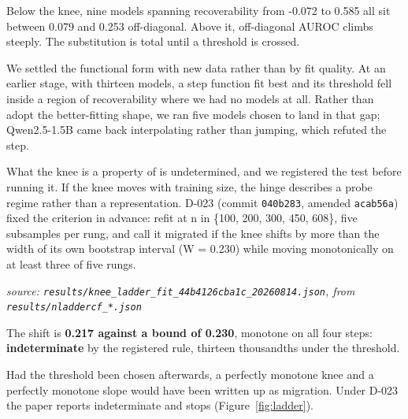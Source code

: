 \documentclass[10pt]{article}
\begin{document}
Below the knee, nine models spanning recoverability from -0.072 to 0.585 all sit between 0.079 and 0.253 off-diagonal. Above it, off-diagonal AUROC climbs steeply. The substitution is total until a threshold is crossed.

We settled the functional form with new data rather than by fit quality. At an earlier stage, with thirteen models, a step function fit best and its threshold fell inside a region of recoverability where we had no models at all. Rather than adopt the better-fitting shape, we ran five models chosen to land in that gap; Qwen2.5-1.5B came back interpolating rather than jumping, which refuted the step.

What the knee is a property of is undetermined, and we registered the test before running it. If the knee moves with training size, the hinge describes a probe regime rather than a representation. D-023 (commit \texttt{040b283}, amended \texttt{acab56a}) fixed the criterion in advance: refit at n in \{100, 200, 300, 450, 608\}, five subsamples per rung, and call it migrated if the knee shifts by more than the width of its own bootstrap interval (W = 0.230) while moving monotonically on at least three of five rungs.

{\footnotesize\raggedright\sloppy \emph{source: \texttt{results/knee\_ladder\_fit\_44b4126cba1c\_20260814.json}, from \texttt{results/nladdercf\_*.json}}\par}

\begin{table}[H]
\centering
\small
{}
\end{table}

The shift is \textbf{0.217 against a bound of 0.230}, monotone on all four steps: \textbf{indeterminate} by the registered rule, thirteen thousandths under the threshold.

Had the threshold been chosen afterwards, a perfectly monotone knee and a perfectly monotone slope would have been written up as migration. Under D-023 the paper reports indeterminate and stops (Figure~\ref{fig:ladder}).
\end{document}
